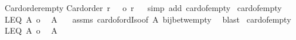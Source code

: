 \begin{isabellebody}
\isamarkupfalse%
%
\endisatagproof
{\isafoldproof}%
%
\isadelimproof
\isanewline
%
\endisadelimproof
\isanewline
{}\isamarkupfalse%
\ Card{\isacharunderscore}{\kern0pt}order{\isacharunderscore}{\kern0pt}empty{\isacharcolon}{\kern0pt}\isanewline
{\isachardoublequoteopen}Card{\isacharunderscore}{\kern0pt}order\ r\ {\isasymLongrightarrow}\ {\isacharbar}{\kern0pt}{\isacharbraceleft}{\kern0pt}{\isacharbraceright}{\kern0pt}{\isacharbar}{\kern0pt}\ {\isasymle}o\ r{\isachardoublequoteclose}%
\isadelimproof
\ %
\endisadelimproof
%
\isatagproof
{}\isamarkupfalse%
\ {\isacharparenleft}{\kern0pt}simp\ add{\isacharcolon}{\kern0pt}\ card{\isacharunderscore}{\kern0pt}of{\isacharunderscore}{\kern0pt}empty{}{\isacharparenright}{\kern0pt}%
\endisatagproof
{\isafoldproof}%
%
\isadelimproof
%
\endisadelimproof
\isanewline
\isanewline
{}\isamarkupfalse%
\ card{\isacharunderscore}{\kern0pt}of{\isacharunderscore}{\kern0pt}empty{}{\isacharcolon}{\kern0pt}\isanewline
{}\ LEQ{\isacharcolon}{\kern0pt}\ {\isachardoublequoteopen}{\isacharbar}{\kern0pt}A{\isacharbar}{\kern0pt}\ {\isacharequal}{\kern0pt}o\ {\isacharbar}{\kern0pt}{\isacharbraceleft}{\kern0pt}{\isacharbraceright}{\kern0pt}{\isacharbar}{\kern0pt}{\isachardoublequoteclose}\isanewline
{}\ {\isachardoublequoteopen}A\ {\isacharequal}{\kern0pt}\ {\isacharbraceleft}{\kern0pt}{\isacharbraceright}{\kern0pt}{\isachardoublequoteclose}\isanewline
%
\isadelimproof
%
\endisadelimproof
%
\isatagproof
{}\isamarkupfalse%
\ assms\ card{\isacharunderscore}{\kern0pt}of{\isacharunderscore}{\kern0pt}ordIso{\isacharbrackleft}{\kern0pt}of\ A{\isacharbrackright}{\kern0pt}\ bij{\isacharunderscore}{\kern0pt}betw{\isacharunderscore}{\kern0pt}empty{}\ \isamarkupfalse%
\ blast%
\endisatagproof
{\isafoldproof}%
%
\isadelimproof
\isanewline
%
\endisadelimproof
\isanewline
{}\isamarkupfalse%
\ card{\isacharunderscore}{\kern0pt}of{\isacharunderscore}{\kern0pt}empty{}{\isacharcolon}{\kern0pt}\isanewline
{}\ LEQ{\isacharcolon}{\kern0pt}\ {\isachardoublequoteopen}{\isacharbar}{\kern0pt}A{\isacharbar}{\kern0pt}\ {\isasymle}o\ {\isacharbar}{\kern0pt}{\isacharbraceleft}{\kern0pt}{\isacharbraceright}{\kern0pt}{\isacharbar}{\kern0pt}{\isachardoublequoteclose}\isanewline
{}\ {\isachardoublequoteopen}A\ {\isacharequal}{\kern0pt}\ {\isacharbraceleft}{\kern0pt}{\isacharbraceright}{\kern0pt}{\isachardoublequoteclose}\isanewline
%
\isadelimproof

\end{isabellebody}
